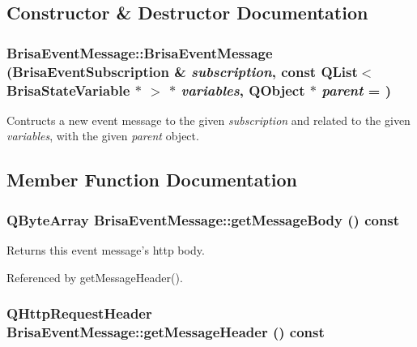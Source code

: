 \subsection{Constructor \& Destructor Documentation}
\hypertarget{classBrisaUpnp_1_1BrisaEventMessage_a66bde1d910078c764004d98bc20dc91e}{
\subsubsection[{BrisaEventMessage}]{\setlength{\rightskip}{0pt plus 5cm}BrisaEventMessage::BrisaEventMessage ({\bf BrisaEventSubscription} \& {\em subscription}, \/  const QList$<$ {\bf BrisaStateVariable} $\ast$ $>$ $\ast$ {\em variables}, \/  QObject $\ast$ {\em parent} = {})}}
\label{classBrisaUpnp_1_1BrisaEventMessage_a66bde1d910078c764004d98bc20dc91e}


Contructs a new event message to the given {\itshape subscription\/} and related to the given {\itshape variables\/}, with the given {\itshape parent\/} object. 

\subsection{Member Function Documentation}
\hypertarget{classBrisaUpnp_1_1BrisaEventMessage_ab984d75c57d4641dec88f0c31bea1e48}{
\subsubsection[{getMessageBody}]{\setlength{\rightskip}{0pt plus 5cm}QByteArray BrisaEventMessage::getMessageBody () const}}
\label{classBrisaUpnp_1_1BrisaEventMessage_ab984d75c57d4641dec88f0c31bea1e48}


Returns this event message's http body. 

Referenced by getMessageHeader().\hypertarget{classBrisaUpnp_1_1BrisaEventMessage_aa457aeb063c630875d09de44fe3f0ca5}{
\subsubsection[{getMessageHeader}]{\setlength{\rightskip}{0pt plus 5cm}QHttpRequestHeader BrisaEventMessage::getMessageHeader () const}}
\label{classBrisaUpnp_1_1BrisaEventMessage_aa457aeb063c630875d09de44fe3f0ca5}


